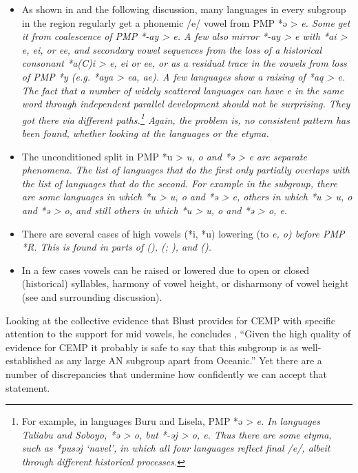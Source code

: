\begin{itemize}
				word should not be surprising.
				An equal number of languages do not.
				The problem is, no consistent pattern has been found,
				so we are not dealing with regular sound correspondences in the rigorous scientific sense.
	\item	As shown in 
				and the following discussion,
				many languages in every subgroup in the region regularly get
				a phonemic /e/ vowel from PMP *ə > \it{e}.
				Some get it from coalescence of PMP *-ay > \it{e}.
				A few also mirror *-ay > \it{e} with *ai > \it{e,
				ei,} or \it{ee}, and secondary vowel sequences from the loss
				of a historical consonant *a(C)i > \it{e,
				ei} or \it{ee}, or as a residual trace in the vowels from loss
				of PMP *y (e.g.
				*aya > \it{ea, ae}).
				A few languages show a raising of *aq > \it{e}.
				The fact that a number of widely scattered languages can have
				\it{e} in the same word through independent parallel development
				should not be surprising.
				They got there via different paths.\footnote{
						For example,
						in  languages Buru
						and Lisela, PMP *ə > \it{e}.
						In  languages Taliabu
						and Soboyo, *ə > \it{o}, but *-əj > \it{o}, \it{e}.
						Thus there are some etyma,
						such as *pusəj ‘navel’,
						in which all four languages reflect final /e/,
						albeit through different historical processes.}
				Again,
				the problem is, no consistent pattern has been found,
				whether looking at the languages or the etyma.
	\item	The unconditioned split in PMP *u > \it{u,
				o} and *ə > \it{e} are separate phenomena.
				The list of languages that do the first only partially overlaps
				with the list of languages that do the second.
				For example in the  subgroup,
				there are some languages in which *u > \it{u, o}
				and *ə > \it{e}, others in which *u > \it{u, o}
				and *ə > \it{o}, and still others in which *u > \it{u, o}
				and *ə > \it{o, e}.
	\item	There are several cases of high vowels (*i,
				*u) lowering (to \it{e, o}) before PMP *R.
				This is found in parts of  (),
				 (; \citealp[84f]{Edwards2021}),
				and  ().
	\item	In a few cases vowels can be raised or lowered due to open
				or closed (historical) syllables,
				harmony of vowel height,
				or disharmony of vowel height (see  and surrounding discussion).
\end{itemize}

Looking at the collective evidence that Blust provides for CEMP
with specific attention to the support for mid vowels,
he concludes \citeyear[740]{Blust2013}, “Given the high quality of evidence
for CEMP it probably is safe to say that this subgroup is as
well-established as any large AN subgroup apart from Oceanic.”
Yet there are a number of discrepancies that undermine how confidently
we can accept that statement.
